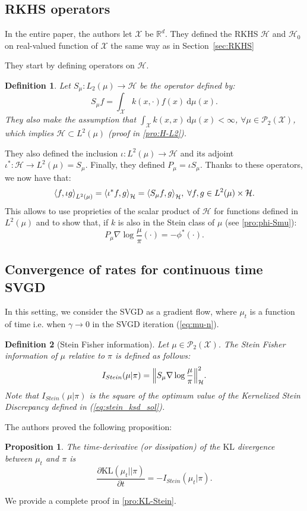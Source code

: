 \documentclass{article}
\newcommand{\R}{\mathbb{R}}
\newcommand{\X}{\mathcal{X}}
\renewcommand{\P}{\mathcal{P}}
\newcommand{\KL}{\mathrm{KL}}
\renewcommand{\H}{\mathcal{H}}
\newcommand{\diff}[2]{\frac{\partial #1}{\partial #2}}
\renewcommand{\d}{\: \mathrm{d}}
\newcommand{\Stein}{I_{Stein}(\mu | \pi)}
\DeclarePairedDelimiter{\norm}{\|}{\|}
\DeclarePairedDelimiter{\sca}{\langle}{\rangle}
\newtheorem{definition}{Definition}
\newtheorem{proposition}{Proposition}
\begin{document}
\subsection{RKHS operators}
In the entire paper, the authors let $\X$ be $\R^d$. They defined
the RKHS $\H$ and $\H_0$ on real-valued function of $\X$ the same way as in
Section~\ref{sec:RKHS}

\noindent
They start by defining operators on $\H$.
\begin{definition}
  Let $S_\mu : L_2(\mu) \to \H$ be the operator defined by:
  $$
  S_\mu f = \int_\X k(x, \cdot) f(x) \d \mu(x).
  $$
  They also make the assumption that $\int_\X k(x, x) \d \mu(x) < \infty$,
  $\forall \mu \in \P_2(\X)$, which implies $\H \subset L^2(\mu)$
  (proof in \ref{pro:H-L2}).
\label{def:S-mu}
\end{definition}
They also defined the inclusion $\iota : L^2(\mu) \to \H$ and
its adjoint $\iota^* : \H \to L^2(\mu) = S_\mu$. Finally, they defined
$P_\mu = \iota S_\mu$. Thanks to these operators, we now have that:
$$
\sca*{f, \iota g}_{L^2(\mu)} = \sca*{\iota^* f, g}_\H = \sca*{S_\mu f, g}_\H,
\; \forall f, g \in L^2(\mu) \times \H.
$$
This allows to use proprieties of the scalar product of $\H$ for functions
defined in $L^2(\mu)$ and to show that, if $k$ is also in the Stein class
of $\mu$ (see \ref{pro:phi-Smu}):
\begin{equation}
    P_\mu \nabla \log \frac{\mu}{\pi}(\cdot) = -\phi^*(\cdot).
    \label{eq:phi-Smu}
\end{equation}


\subsection{Convergence of rates for continuous time SVGD}
In this setting, we consider the SVGD as a gradient flow, where $\mu_t$ is a function
of time i.e. when $\gamma \to 0$ in the SVGD iteration (\ref{eq:mu-n}).

\begin{definition}[Stein Fisher information]
  Let $\mu \in \P_2(\X)$. The Stein Fisher information of $\mu$ relative to
  $\pi$ is defined as follows:
  $$
  \Stein = \norm*{S_\mu \nabla \log \frac{\mu}{\pi}}_\H^2.
  $$
  Note that $\Stein$ is the square of the optimum value of the
  Kernelized Stein Discrepancy defined in (\ref{eq:stein_ksd_sol}).
\end{definition}

The authors proved the following proposition:
\begin{proposition}\label{prop:KL-Stein}
  The time-derivative (or dissipation) of the $\KL$ divergence between $\mu_t$ and $\pi$ is
  \begin{equation}
    \diff{\KL(\mu_t || \pi)}{t} = - I_{Stein}(\mu_t | \pi).
    \label{eq:KL-time-diff}
  \end{equation}
\end{proposition}
\noindent
We provide a complete proof in \ref{pro:KL-Stein}.\\
\end{document}
